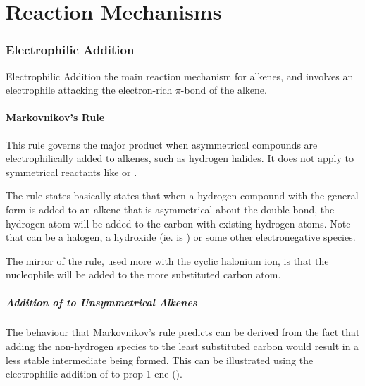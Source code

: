 
\pagebreak
\hypertarget{AppendixReactionMechanisms}{}
\part{Reaction Mechanisms}

	\hypertarget{AppendixElectrophilicAddition}{}
	\section{Electrophilic Addition}

		Electrophilic Addition the main reaction mechanism for alkenes, and involves an electrophile attacking the electron-rich
		$\pi$-bond of the alkene.


		\subsection{Markovnikov's Rule}

			This rule governs the major product when asymmetrical compounds are electrophilically added to alkenes,
			such as hydrogen halides. It does not apply to symmetrical reactants like  or .

			The rule states basically states that when a hydrogen compound with the general form  is added to an
			alkene that is asymmetrical about the double-bond, the hydrogen atom will be added to the carbon with 
			existing hydrogen atoms. Note that  can be a halogen, a hydroxide (ie.  is ) or some other
			electronegative species.

			The mirror of the rule, used more with the cyclic halonium ion, is that the nucleophile will be added to the more substituted
			carbon atom.


			\pagebreak
			\hypertarget{AppendixMarkovnikovsRuleIllustration}{}
			\subsubsection{Addition of  to Unsymmetrical Alkenes}

				The behaviour that Markovnikov's rule predicts can be derived from the fact that adding the non-hydrogen species to the least substituted carbon would
				result in a less stable intermediate being formed. This can be illustrated using the electrophilic addition of
				 to prop-1-ene ().

